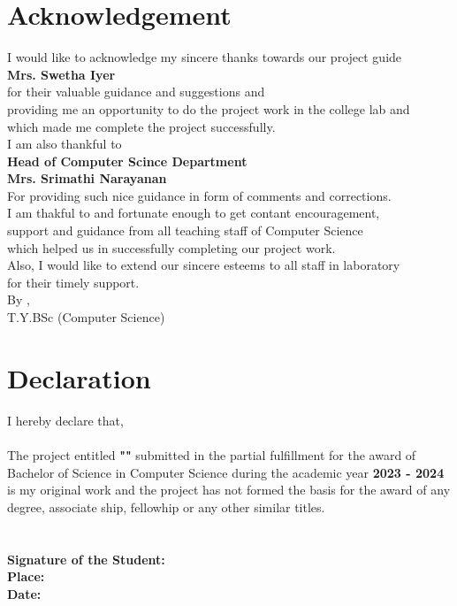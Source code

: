 \documentclass[12pt]{article}
\makeatletter
\let\inserttitle\@title
\let\insertauthor\@author
\makeatother
\begin{document}
\fontsize{12pt}{24pt}\selectfont

\section{Acknowledgement}
\begin{center}
	\vspace{2cm}
	I would like to acknowledge my sincere thanks towards our project guide \\
	\textbf{Mrs. Swetha Iyer} \\
	for their valuable guidance and suggestions and \\
	providing me an opportunity to do the project work in the college lab and \\
	which made me complete the project successfully. \\
	\vspace{2cm}
	I am also thankful to \\
	\textbf{Head of Computer Scince Department} \\
	\textbf{Mrs. Srimathi Narayanan} \\
	For providing such nice guidance in form of comments and corrections. \\
	I am thakful to and fortunate enough to get contant encouragement, \\
	support and guidance from all teaching staff of Computer Science \\
	which helped us in successfully completing our project work. \\
Also, I would like to extend our sincere esteems to all staff in laboratory \\
	for their timely support. \\
	\vspace{2cm}
	By \textbf{\insertauthor}, \\
	T.Y.BSc (Computer Science)
\end{center}


\section{Declaration}
\vspace{2cm}
I \textbf{\underline{\insertauthor}} hereby declare that, \\
\bigskip \\
The project entitled
\textbf{"\underline{\MakeUppercase{\inserttitle}}"}
submitted in the partial fulfillment for the award of Bachelor of Science in Computer Science during the academic year \textbf{2023 - 2024} is my original work and the project has not formed the basis for the award of any degree, associate ship, fellowhip or any other similar titles. \\ \\ \\
\vspace{2cm}
\textbf{Signature of the Student:} \\
\bigskip
\textbf{Place:} \\
\bigskip
\textbf{Date:} \\
\end{document}
